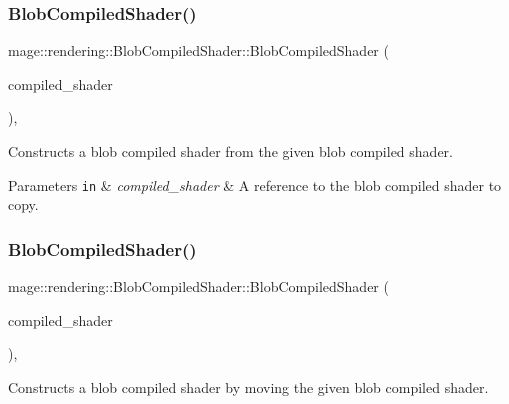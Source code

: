 \subsubsection{\texorpdfstring{Blob\+Compiled\+Shader()}{BlobCompiledShader()}\hspace{0.1cm}{\footnotesize\ttfamily [2/3]}}
{\footnotesize\ttfamily mage\+::rendering\+::\+Blob\+Compiled\+Shader\+::\+Blob\+Compiled\+Shader (\begin{DoxyParamCaption}\item[{const \hyperlink{classmage_1_1rendering_1_1_blob_compiled_shader}{Blob\+Compiled\+Shader} \&}]{compiled\+\_\+shader }\end{DoxyParamCaption})\hspace{0.3cm}{\ttfamily [default]}, {\ttfamily [noexcept]}}

Constructs a blob compiled shader from the given blob compiled shader.


\begin{DoxyParams}[1]{Parameters}
\mbox{\tt in}  & {\em compiled\+\_\+shader} & A reference to the blob compiled shader to copy. \\
\hline
\end{DoxyParams}
\hypertarget{classmage_1_1rendering_1_1_blob_compiled_shader_afa58cbbad81febc6c2470f6f1b0de2ce}{}\label{classmage_1_1rendering_1_1_blob_compiled_shader_afa58cbbad81febc6c2470f6f1b0de2ce} 
\subsubsection{\texorpdfstring{Blob\+Compiled\+Shader()}{BlobCompiledShader()}\hspace{0.1cm}{\footnotesize\ttfamily [3/3]}}
{\footnotesize\ttfamily mage\+::rendering\+::\+Blob\+Compiled\+Shader\+::\+Blob\+Compiled\+Shader (\begin{DoxyParamCaption}\item[{\hyperlink{classmage_1_1rendering_1_1_blob_compiled_shader}{Blob\+Compiled\+Shader} \&\&}]{compiled\+\_\+shader }\end{DoxyParamCaption})\hspace{0.3cm}{\ttfamily [default]}, {\ttfamily [noexcept]}}

Constructs a blob compiled shader by moving the given blob compiled shader.


